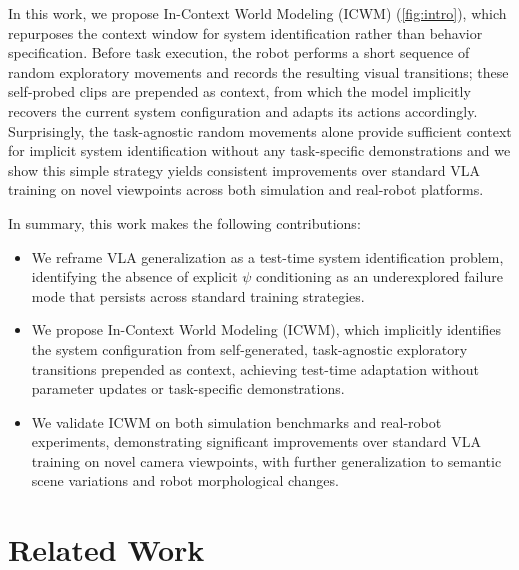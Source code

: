 \documentclass{llmxive}
\begin{document}
In this work, we propose In-Context World Modeling (ICWM) (\autoref{fig:intro}), which repurposes the context window for system 
identification rather than behavior specification. Before task execution, the robot performs a short sequence of random exploratory movements and records the resulting visual transitions; these self-probed clips are prepended as context, from which the model implicitly recovers the current system configuration and adapts its actions accordingly. 
Surprisingly, the task-agnostic random movements alone provide sufficient context for implicit system identification without any task-specific demonstrations and we show this simple strategy yields consistent improvements over standard VLA training on novel viewpoints across both simulation and real-robot platforms.



In summary, this work makes the following contributions:
\begin{itemize}
    \item We reframe VLA generalization as a test-time system identification problem, identifying the absence of explicit $\psi$ conditioning as an underexplored failure mode that persists across standard training strategies.
    \item We propose In-Context World Modeling (ICWM), which implicitly identifies the system configuration from self-generated, task-agnostic exploratory transitions prepended as context, achieving test-time adaptation without parameter updates or task-specific demonstrations.
    \item We validate ICWM on both simulation benchmarks and real-robot experiments, demonstrating significant improvements over standard VLA training on novel camera viewpoints, with further generalization to semantic scene variations and robot morphological changes.
\end{itemize}



\section{Related Work}
\end{document}

